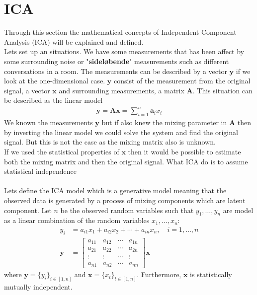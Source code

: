 \section{ICA}
Through this section the mathematical concepts of Independent Component Analysis (ICA) will be explained and defined.
\\
Lets set up an situations. We have some measurements that has been affect by some surrounding noise or "\textbf{sideløbende}" measurements such as different conversations in a room. The measurements can be described by a vector $\mathbf{y}$ if we look at the one-dimensional case. $\mathbf{y}$ consist of the measurement from the original signal, a vector $\mathbf{x}$ and surrounding measurements, a matrix $\mathbf{A}$. This situation can be described as the linear model
\begin{align*}
\mathbf{y} = \mathbf{Ax} = \sum_{i=1}^n \mathbf{a}_i x_i
\end{align*}
We known the measurements $\mathbf{y}$ but if also knew the mixing parameter in $\mathbf{A}$ then by inverting the linear model we could solve the system and find the original signal. But this is not the case as the mixing matrix also is unknown.
\\
If we used the statistical properties of $\mathbf{x}$ then it would be possible to estimate both the mixing matrix and then the original signal. What ICA do is to assume statistical independence 
\\ \\
Lets define the ICA model which is a generative model meaning that the observed data is generated by a process of mixing components which are latent component. Let $n$ be the observed random variables such that $y_1, \dots, y_n$ are model as a linear combination of the random variables $x_1, \dots, x_n$:
\begin{align*}
y_i &= a_{i1} x_1 + a_{i2} x_2 + \cdots + a_{in} x_n, \quad i = 1, \dots, n \\
\mathbf{y} &= 
\begin{bmatrix}
a_{11} & a_{12} & \cdots & a_{1n} \\
a_{21} & a_{22} & \cdots & a_{2n} \\
\vdots & \vdots & \cdots & \vdots \\
a_{n1} & a_{n2} & \cdots & a_{nn}
\end{bmatrix}
\mathbf{x}
\end{align*}
where $\mathbf{y} = \{ y_i \}_{i \in [1,n]}$ and $\mathbf{x} = \{ x_t \}_{t \in [1,n]}$. Furthermore, $\mathbf{x}$ is statistically mutually independent.

